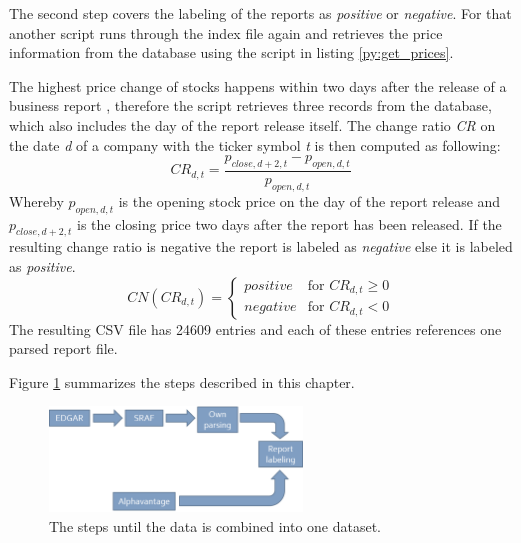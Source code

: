 The second step covers the labeling of the reports as \textit{positive} or \textit{negative}.
For that another script runs through the index file again and retrieves the price information from the database using the script in listing \ref{py:get_prices}.

The highest price change of stocks happens within two days after the release of a business report \cite{Feldman2010}, therefore the script retrieves three records from the database, which also includes the day of the report release itself.
The change ratio \textit{CR} on the date \textit{d} of a company with the ticker symbol \textit{t} is then computed as following:
\begin{equation}
    CR_{d,t} = \frac{p_{close, d + 2, t} - p_{open, d, t}}{p_{open, d, t}}
\end{equation}
Whereby $p_{open, d, t}$ is the opening stock price on the day of the report release and $p_{close, d + 2, t}$ is the closing price two days after the report has been released.
If the resulting change ratio is negative the report is labeled as \textit{negative} else it is labeled as \textit{positive}.
\begin{equation}
    CN(CR_{d,t}) = \begin{cases}
        positive & \text{for } CR_{d,t} \geq 0 \\
        negative & \text{for } CR_{d,t} < 0
    \end{cases}
\end{equation}
The resulting \ac{CSV} file has 24609 entries and each of these entries references one parsed report file.

Figure \ref{figure:data_flowchart} summarizes the steps described in this chapter.
\begin{figure}[h]
    \centering
    \includegraphics[width=0.6\textwidth]{figures/Flowchart_Data.png}
    \caption{The steps until the data is combined into one dataset.}
    \label{figure:data_flowchart}
\end{figure}
